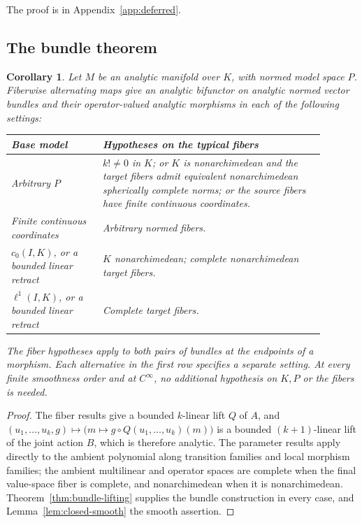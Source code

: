 \documentclass[11pt]{amsart}
\newtheorem{corollary}[theorem]{Corollary}
\theoremstyle{definition}
\theoremstyle{remark}
\numberwithin{equation}{section}
\theoremstyle{plain}
\theoremstyle{definition}
\theoremstyle{plain}
\begin{document}
The proof is in Appendix~\ref{app:deferred}.

\subsection{The bundle theorem}\label{spl:ssec:bundle}

\begin{corollary}\label{cor:bundle-cases}
Let $M$ be an analytic manifold over $K$, with normed model space $P$. Fiberwise alternating maps give an analytic bifunctor on analytic normed vector bundles and their operator-valued analytic morphisms in each of the following settings:
\begin{center}
\begin{tabular}{p{0.26\linewidth}p{0.63\linewidth}}
\hline
Base model & Hypotheses on the typical fibers\\
\hline
Arbitrary $P$ & $k!\ne0$ in $K$; or $K$ is nonarchimedean and the target fibers admit equivalent nonarchimedean spherically complete norms; or the source fibers have finite continuous coordinates.\\[3pt]
Finite continuous coordinates & Arbitrary normed fibers.\\[3pt]
$c_0(I,K)$, or a bounded linear retract & $K$ nonarchimedean; complete nonarchimedean target fibers.\\[3pt]
$\ell^1(I,K)$, or a bounded linear retract & Complete target fibers.\\
\hline
\end{tabular}
\end{center}
The fiber hypotheses apply to both pairs of bundles at the endpoints of a morphism. Each alternative in the first row specifies a separate setting. At every finite smoothness order and at $C^\infty$, no additional hypothesis on $K,P$ or the fibers is needed.
\end{corollary}
\begin{proof}
The fiber results give a bounded $k$-linear lift $Q$ of $A$, and
$(u_1,\ldots,u_k,g)\mapsto\bigl(m\mapsto g\circ Q(u_1,\ldots,u_k)(m)\bigr)$ is a bounded $(k+1)$-linear lift of the joint
action $B$, which is therefore analytic. The parameter results apply directly to the ambient polynomial along transition
families and local morphism families; the ambient multilinear and operator spaces are complete when the final
value-space fiber is complete, and nonarchimedean when it is nonarchimedean. Theorem~\ref{thm:bundle-lifting} supplies the
bundle construction in every case, and Lemma~\ref{lem:closed-smooth} the smooth assertion.
\end{proof}
\end{document}
